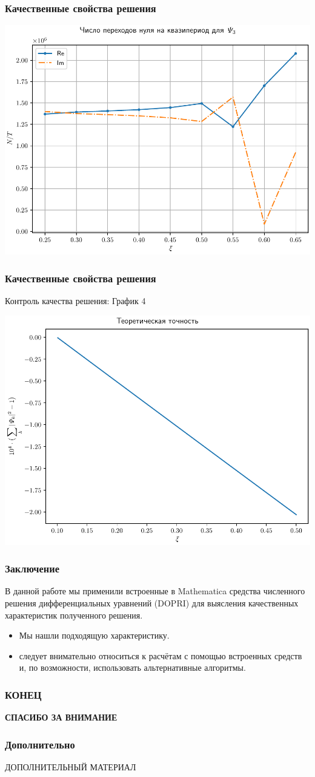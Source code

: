 \documentclass[utf8,9pt,mathserif,usepdftitle=false]{beamer}
\begin{document}
\begin{frame}
	\frametitle{Качественные свойства решения}%
	\includegraphics[width=\linewidth]{psi3-rel-trans-ru}
\end{frame}

\begin{frame}
  \frametitle{Качественные свойства решения}%
  Контроль качества решения:
  График 4
  
  \includegraphics[width=\linewidth]{control-scaled}
\end{frame}

\begin{frame}
  \frametitle{Заключение}%
  В данной работе мы применили встроенные в Mathematica средства численного
  решения дифференциальных уравнений (DOPRI) для выясления качественных
  характеристик полученного решения. 
  \begin{itemize}
  \item<1-> Мы нашли подходящую характеристику.
  \item<2->следует внимательно относиться к расчётам с помощью встроенных средств и, по возможности, использовать альтернативные алгоритмы.
  \end{itemize}
\end{frame}

\begin{frame}
  \frametitle{КОНЕЦ}%
  \LARGE%
  \centering%
  \bfseries%
  СПАСИБО ЗА ВНИМАНИЕ%
\end{frame}

\begin{frame}
  \frametitle{Дополнительно}%
  \centering%
  ДОПОЛНИТЕЛЬНЫЙ МАТЕРИАЛ
\end{frame}
\end{document}
